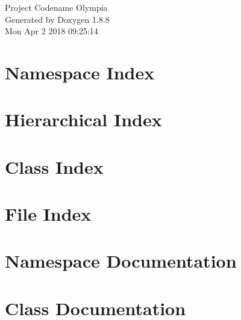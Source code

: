 \documentclass[twoside]{book}
\newcommand{\+}{\discretionary{\mbox{\scriptsize$\hookleftarrow$}}{}{}}
\newcommand{\clearemptydoublepage}{%
  \newpage{\pagestyle{empty}\cleardoublepage}%
}
\begin{document}
\hypersetup{pageanchor=false,
             bookmarks=true,
             bookmarksnumbered=true,
             pdfencoding=unicode
            }
\begin{titlepage}
\vspace*{7cm}
\begin{center}%
{\Large Project Codename Olympia }\\
\vspace*{1cm}
{\large Generated by Doxygen 1.8.8}\\
\vspace*{0.5cm}
{\small Mon Apr 2 2018 09:25:14}\\
\end{center}
\end{titlepage}
\clearemptydoublepage
\tableofcontents
\clearemptydoublepage
{}
\hypersetup{pageanchor=true}

\chapter{Namespace Index}

\chapter{Hierarchical Index}

\chapter{Class Index}

\chapter{File Index}

\chapter{Namespace Documentation}

\chapter{Class Documentation}





















\end{document}
